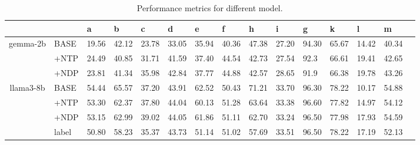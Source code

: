 \documentclass{article}
\begin{document}
\begin{table}[htbp]
 \centering %
\begin{tabularx}{\textwidth}{c *{14}{X}}
\toprule
& & a & b & c & d & e & f & h & i & g & k & l & m \\
\midrule
\multirow{3}{*}{gemma-2b} 
&  BASE&  19.56 & 42.12 & 23.78 & 33.05 & 35.94 & 40.36 & 47.38 & 27.20 & 94.30 & 65.67 & 14.42 & 40.34 \\
& +NTP & 24.49 & 40.85 & 31.71 & 41.59 & 37.40 & 44.54 & 42.73 & 27.54 & 92.3 & 66.61 & 19.41&42.65  \\
& +NDP &23.81 & 41.34 & 35.98 & 42.84 & 37.77 & 44.88 & 42.57 & 28.65 & 91.9 & 66.38 & 19.78 & 43.26 \\
\midrule
\midrule
\multirow{4}{*}{llama3-8b} 
& BASE & 54.44 & 65.57 & 37.20 & 43.91 & 62.52 & 50.43 & 71.21 & 33.70 & 96.30 & 78.22 & 10.17 & 54.88 \\
& +NTP &53.30 & 62.37 & 37.80 & 44.04 & 60.13 & 51.28 & 63.64 & 33.38 & 96.60 & 77.82 & 14.97 & 54.12 \\
& +NDP & 53.15 & 62.99 & 39.02 & 44.05 & 61.86 & 51.11 & 62.70 & 33.24 & 96.50 & 77.98 & 17.93 & 54.59 \\
& label & 50.80 & 58.23 & 35.37 & 43.73 & 51.14 & 51.02 & 57.69 & 33.51 & 96.50 & 78.22 & 17.19 & 52.13  \\
\bottomrule
\end{tabularx}
\caption{Performance metrics for different model.} %
\label{tab:performance} %
\end{table}
\end{document}

